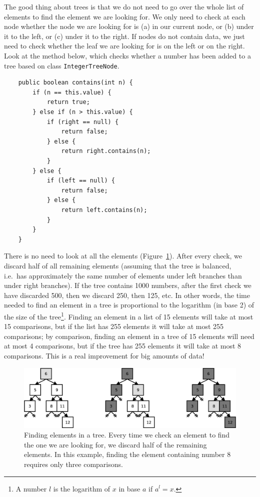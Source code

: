 The good thing about trees is that we do not need to go over the whole
list of elements to find the element we are looking for. We only need
to check at each node whether the node we are looking for is (a) in our
current node, or (b) under it to the left, or (c) under it to the right. If
nodes do not contain data, we just need to check whether the leaf we
are looking for is on the left or on the right. Look at the method
below, which checks whether a number has been added to a tree based on
class \verb+IntegerTreeNode+. 

\begin{verbatim}
    public boolean contains(int n) {
        if (n == this.value) {
            return true;
        } else if (n > this.value) {
            if (right == null) {
                return false;
            } else {
                return right.contains(n);
            }
        } else {
            if (left == null) {
                return false;
            } else {
                return left.contains(n);
            }
        }
    }
\end{verbatim}

There is no need to look at all the elements
(Figure~\ref{fig:fhsdhshgfhjsdg}). After every check, we
discard half of all remaining elements (assuming that the tree is
balanced, i.e.~has approximately the same number of elements under left
branches than under right branches). If the tree contains 1000
numbers, after the first check we have discarded 500, then we discard
250, then 125, etc. In other words, the time needed to find an element
in a tree is proportional to the logarithm (in base 2) of the size of
the tree\footnote{A number $l$ is the logarithm of $x$ in base $a$ if
 $a^l = x$.}. Finding an element in a list of 15 elements will take at
most 15 comparisons, but if the list has 255 elements it will take at
most 255 comparisons; by comparison, 
finding an element in a tree of 15 elements will
need at most 4 comparisons, but if the tree has 255 elements it will
take at most 8 comparisons. This is a real improvement for big amounts
of data!

\begin{figure}[hbtp]
  \centering
  \includegraphics[width=\textwidth]{gfx/tree-find}
  \caption{Finding elements in a tree. Every time we check an element
    to find the one we are looking for, we discard half of the
    remaining elements. In this example, finding the element
    containing number 8 requires only three comparisons.}
  \label{fig:fhsdhshgfhjsdg}
\end{figure}

